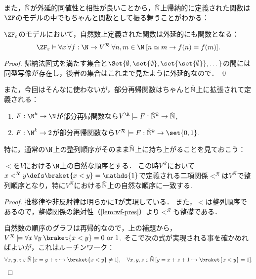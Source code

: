 \documentclass[realisability.tex]{subfiles}
\begin{document}
また，$\NN$が外延的同値性と相性が良いことから，$\NN$上帰納的に定義された関数は$\ZF$のモデルの中でもちゃんと関数として振る舞うことがわかる：

\begin{lemma}\label{lem:nat-func-strong}
 $\ZF_{\varepsilon}$のモデルにおいて，自然数上定義された関数は外延的にも関数となる：
 \[
 \ZFe \vdash \forall x \: \forall f : \N \to V^{\mathcal{R}}\:
 \forall n, m \in \N \: [n \simeq m \to f(n) = f(m)].
 \]
\end{lemma}
\begin{proof}
 帰納法図式を満たす集合と$\Set{ \emptyset, \set{\emptyset}, \set{\set{\emptyset}}, \dots}$の間には同型写像が存在し，後者の集合はこれまで見たように外延的なので． \qed
\end{proof}

また，今回はそんなに使わないが，部分再帰関数はちゃんと$\NN$上に拡張されて定義される：
\begin{lemma}\label{lem:recursives-defined}
 \begin{enumerate}
  \item $F: \N^k \to \N$が部分再帰関数なら$V^{\R} \models F: \NN^k \to \NN$,
  \item $F: \N^k \to 2$が部分再帰関数なら$V^{\mathcal{R}} \models F: \NN^k \to \set{0, 1}$.
 \end{enumerate}
\end{lemma}

特に，通常の$\N$上の整列順序がそのまま$\NN$上に持ち上がることを見ておこう：

\begin{lemma}[$\NN$における自然な順序]\label{lem:nat-ord-in-NN}
 ${<}$を$V$における$\N$上の自然な順序とする．
 この時$V^{\mathcal{R}}$において$x <^{\mathcal{R}} y \defs \braket{x < y} = \mathds{1}$で定義される二項関係$<^{\mathcal{R}}$は$V^{\mathcal{R}}$で整列順序となり，特に$V^{\mathcal{R}}$における$\NN$上の自然な順序に一致する.
\end{lemma}
\begin{proof}
 推移律や非反射律は明らかに$\mathsf{\mathbf{I}}$が実現している．
 また，$<$は整列順序であるので，整礎関係の絶対性（\cref{lem:wf-pres}）より$<^\mathcal{R}$も整礎である．

 自然数の順序のグラフは再帰的なので，上の補題から，$V^{\mathcal{R}} \models \forall x\: \forall y\: \braket{x < y} = 0 \text{ or } 1$.
 そこで次の式が実現される事を確かめればよいが，これはルーチンワーク：
 \[
  \forall x, y, z \strin \NN\: [x = y + z \hookrightarrow \braket{x < y} \neq 1],\quad
  \forall x, y, z \strin \NN\: [y = x + z + 1 \hookrightarrow \braket{x < y} = 1].
 \]
\end{proof}
\end{document}
